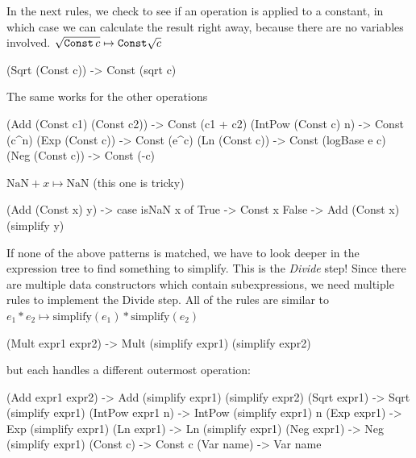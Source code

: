 \documentclass[12pt]{amsbook}
\begin{document}
In the next rules, we check to see if an operation is applied to
a constant, in which case we can calculate the result right away,
because there are no variables involved.
$\sqrt{\text{\texttt{Const}}\, c} \mapsto \text{\texttt{Const}} \sqrt{c}$
\vspace{-12pt}
\begin{code}
               (Sqrt (Const c)) -> Const (sqrt c)
\end{code}
The same works for the other operations
\vspace{-12pt}
\begin{code}
               (Add (Const c1) (Const c2)) -> Const (c1 + c2)
               (IntPow (Const c) n) -> Const (c^n)
               (Exp (Const c)) -> Const (e^c)
               (Ln (Const c)) -> Const (logBase e c)
               (Neg (Const c)) -> Const (-c)
\end{code}
$\text{NaN} + x \mapsto \text{NaN}$  (this one is tricky)
\vspace{-12pt}
\begin{code}
               (Add (Const x) y)
                  -> case isNaN x of
                       True  -> Const x
                       False -> Add (Const x) (simplify y)
\end{code}
If none of the above patterns is matched, 
we have to look deeper in the expression tree to find something
to simplify.
This is the \emph{Divide} step!
Since there are multiple data constructors which contain 
subexpressions, we need multiple rules to implement the Divide step.
All of the rules are similar to
$e_1 * e_2 \mapsto \text{simplify}(e_1) * \text{simplify}(e_2)$
\vspace{-12pt}
\begin{code}
               (Mult expr1 expr2) -> Mult (simplify expr1) (simplify expr2)
\end{code}
but each handles a different outermost operation:
\vspace{-12pt}
\begin{code}
               (Add expr1 expr2) -> Add (simplify expr1) (simplify expr2)
               (Sqrt expr1) -> Sqrt (simplify expr1)
               (IntPow expr1 n) -> IntPow (simplify expr1) n
               (Exp expr1) -> Exp (simplify expr1)
               (Ln expr1) -> Ln (simplify expr1)
               (Neg expr1) -> Neg (simplify expr1)
               (Const c) -> Const c
               (Var name) -> Var name
\end{code}
\end{document}
